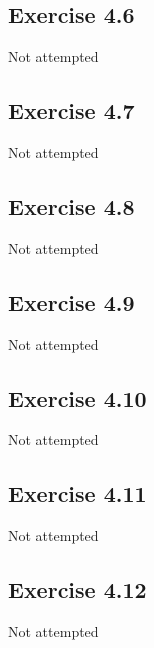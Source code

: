 \subsection{Exercise 4.6}
Not attempted

\subsection{Exercise 4.7}
Not attempted

\subsection{Exercise 4.8}
Not attempted

\subsection{Exercise 4.9}
Not attempted

\subsection{Exercise 4.10}
Not attempted

\subsection{Exercise 4.11}
Not attempted

\subsection{Exercise 4.12}
Not attempted

